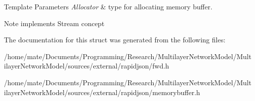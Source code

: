 \begin{DoxyTemplParams}{Template Parameters}
{\em Allocator} & type for allocating memory buffer. \\
\hline
\end{DoxyTemplParams}
\begin{DoxyNote}{Note}
implements Stream concept 
\end{DoxyNote}


The documentation for this struct was generated from the following files\+:\begin{DoxyCompactItemize}
\item 
/home/mate/\+Documents/\+Programming/\+Research/\+Multilayer\+Network\+Model/\+Multilayer\+Network\+Model/sources/external/rapidjson/fwd.\+h\item 
/home/mate/\+Documents/\+Programming/\+Research/\+Multilayer\+Network\+Model/\+Multilayer\+Network\+Model/sources/external/rapidjson/memorybuffer.\+h\end{DoxyCompactItemize}
